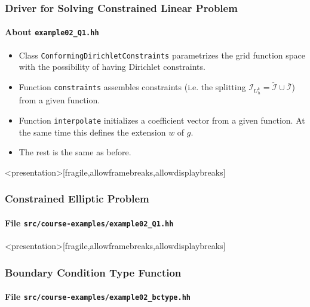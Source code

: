 \begin{frame}
\frametitle{Driver for Solving Constrained Linear Problem}
\framesubtitle{About \lstinline{example02_Q1.hh}}
\begin{itemize}
\item Class \lstinline{ConformingDirichletConstraints} parametrizes the grid function space
with the possibility of having Dirichlet constraints.
\item Function \lstinline{constraints} assembles constraints (i.e. the splitting 
$\mathcal{I}_{U_h^k} = \tilde{\mathcal{I}} \cup \bar{\mathcal{I}}$) from a given function.
\item Function \lstinline{interpolate} initializes a coefficient vector from a given function.
At the same time this defines the extension $w$ of $g$.
\item The rest is the same as before.
\end{itemize}
\end{frame}

\begin{frame}<presentation>[fragile,allowframebreaks,allowdisplaybreaks]
\frametitle<presentation>{Constrained Elliptic Problem}
\framesubtitle<presentation>{File \texttt{src/course-examples/example02\_Q1.hh}}

\end{frame}

\begin{frame}<presentation>[fragile,allowframebreaks,allowdisplaybreaks]
\frametitle<presentation>{Boundary Condition Type Function}
\framesubtitle<presentation>{File \texttt{src/course-examples/example02\_bctype.hh}}

\end{frame}

